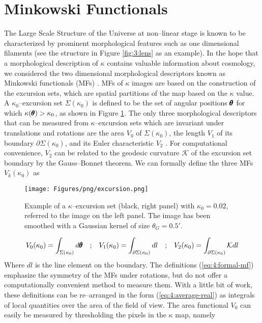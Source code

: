 \section{Minkowski Functionals}
\label{sec:4:mink}
The Large Scale Structure of the Universe at non--linear stage is known to be characterized by prominent morphological features such as one dimensional filaments (see the structure in Figure \ref{fig:3:lens} as an example). In the hope that a morphological description of $\kappa$ contains valuable information about cosmology, we considered the two dimensional morphological descriptors known as Minkowski functionals (MFs) \citep{Tomita,MatsubaraLong}. MFs of $\kappa$ images are based on the construction of the excursion sets, which are spatial partitions of the map based on the $\kappa$ value. A $\kappa_0$--excursion set $\Sigma(\kappa_0)$ is defined to be the set of angular positions $\pmb{\theta}$ for which $\kappa(\pmb{\theta})>\kappa_0$, as shown in Figure \ref{fig:4:excursion}. The only three morphological descriptors that can be measured from $\kappa$--excursion sets which are invariant under translations and rotations are the area $V_0$ of $\Sigma(\kappa_0)$, the length $V_1$ of its boundary $\partial\Sigma(\kappa_0)$, and its Euler characteristic $V_2$ \citep{MatsubaraLong}. For computational convenience, $V_2$ can be related to the geodesic curvature $\mathcal{K}$ of the excursion set boundary by the Gauss--Bonnet theorem. We can formally define the three MFs $V_k(\kappa_0)$ as 
%
\begin{figure}
\begin{center}
\texttt{[image: Figures/png/excursion.png]}
\end{center}
\caption{Example of a $\kappa$--excursion set (black, right panel) with $\kappa_0=0.02$, referred to the image on the left panel. The image has been smoothed with a Gaussian kernel of size $\theta_G=0.5'$.}
\label{fig:4:excursion}
\end{figure}
%
\begin{equation}
\label{eq:4:formal-mf}
\begin{matrix}
\displaystyle V_0(\kappa_0) = \int_{\Sigma(\kappa_0)} d\pmb{\theta} & ; & \displaystyle V_1(\kappa_0) = \int_{\partial\Sigma(\kappa_0)} dl & ; & \displaystyle V_2(\kappa_0) = \int_{\partial\Sigma(\kappa_0)}\mathcal{K}dl
\end{matrix}
\end{equation}   
%
Where $dl$ is the line element on the boundary. The definitions (\ref{eq:4:formal-mf}) emphasize the symmetry of the MFs under rotations, but do not offer a computationally convenient method to measure them. With a little bit of work, these definitions can be re--arranged in the form (\ref{eq:4:average-real}) as integrals of local quantities over the area of the field of view. The area functional $V_0$ can easily be measured by thresholding the pixels in the $\kappa$ map, namely

